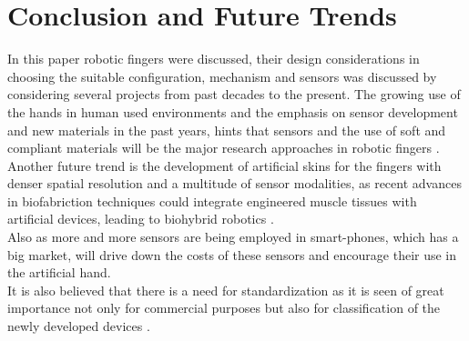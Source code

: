 \documentclass[a4paper, 10pt, conference]{ieeeconf}      %
\begin{document}
\section{\textbf{Conclusion and Future Trends}}
In this paper robotic fingers were discussed, their design considerations in choosing the suitable configuration, mechanism and sensors was discussed by considering several projects from past decades to the present. The growing use of the hands in human used environments and the emphasis on sensor development and new materials in the past years, hints that sensors and the use of soft and compliant materials will be the major research approaches in robotic fingers \cite{spiers2018variable}.\\
Another future trend is the development of artificial skins for the fingers with denser spatial resolution and a multitude of sensor modalities, as recent advances in biofabriction techniques could integrate engineered muscle tissues with artificial devices, leading to biohybrid robotics \cite{feinberg2015biological} \cite{morimoto2018biohybrid}.\\
Also as more and more sensors are being employed in smart-phones, which has a big market, will drive down the costs of these sensors and encourage their use in the artificial hand.\\
It is also believed that there is a need for standardization as it is seen of great importance not only for commercial purposes but also for classification of the newly developed devices \cite{ramirez20173}.\\
\end{document}
